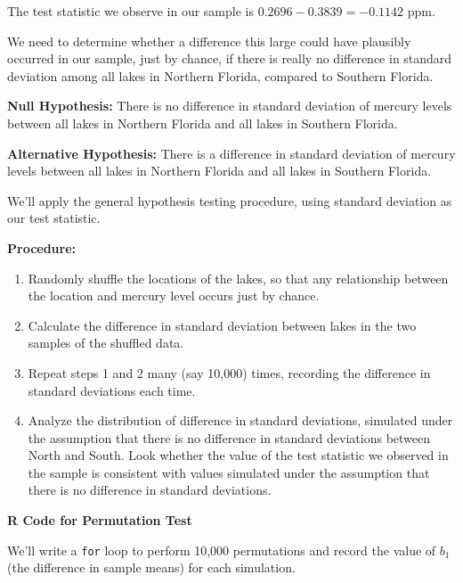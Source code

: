 \documentclass[
  letterpaper,
  DIV=11,
  numbers=noendperiod]{scrreprt}
\begin{document}
The test statistic we observe in our sample is
\(0.2696-0.3839 = -0.1142\) ppm.

We need to determine whether a difference this large could have
plausibly occurred in our sample, just by chance, if there is really no
difference in standard deviation among all lakes in Northern Florida,
compared to Southern Florida.

\textbf{Null Hypothesis:} There is no difference in standard deviation
of mercury levels between all lakes in Northern Florida and all lakes in
Southern Florida.

\textbf{Alternative Hypothesis:} There is a difference in standard
deviation of mercury levels between all lakes in Northern Florida and
all lakes in Southern Florida.

We'll apply the general hypothesis testing procedure, using standard
deviation as our test statistic.

\textbf{Procedure:}

\begin{enumerate}
\def\labelenumi{\arabic{enumi}.}
\item
  Randomly shuffle the locations of the lakes, so that any relationship
  between the location and mercury level occurs just by chance.
\item
  Calculate the difference in standard deviation between lakes in the
  two samples of the shuffled data.
\item
  Repeat steps 1 and 2 many (say 10,000) times, recording the difference
  in standard deviations each time.
\item
  Analyze the distribution of difference in standard deviations,
  simulated under the assumption that there is no difference in standard
  deviations between North and South. Look whether the value of the test
  statistic we observed in the sample is consistent with values
  simulated under the assumption that there is no difference in standard
  deviations.
\end{enumerate}

\textbf{R Code for Permutation Test}

We'll write a \texttt{for} loop to perform 10,000 permutations and
record the value of \(b_1\) (the difference in sample means) for each
simulation.
\end{document}
